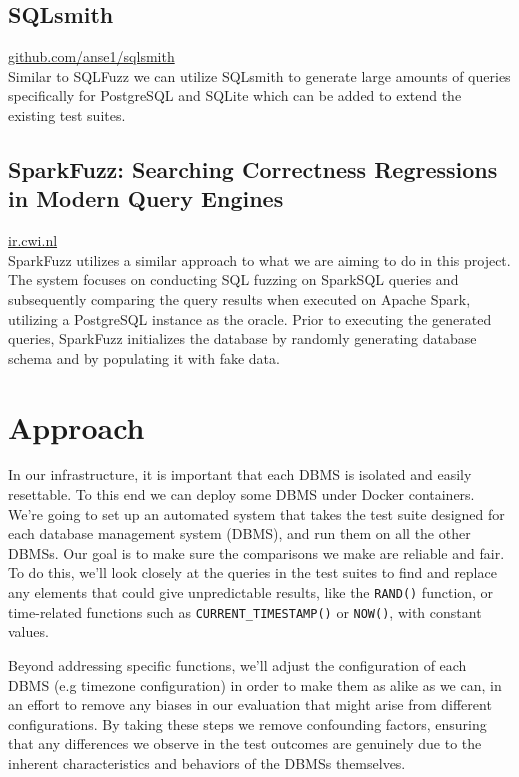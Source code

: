 \documentclass[acmsmall,nonacm]{acmart}
\newcommand\exthref[2]{\href{#1}{\faicon{share-square-o} #2}}
\begin{document}
\subsection*{SQLsmith}
\exthref{https://github.com/anse1/sqlsmith}{github.com/anse1/sqlsmith}\\
Similar to SQLFuzz we can utilize SQLsmith to generate large amounts of queries specifically for PostgreSQL and SQLite which can be added to extend the existing test suites.

\subsection*{SparkFuzz: Searching Correctness Regressions in Modern Query Engines}
\exthref{https://ir.cwi.nl/pub/30222/3395032.3395327.pdf}{ir.cwi.nl}\\
SparkFuzz utilizes a similar approach to what we are aiming to do in this project. The system focuses on conducting SQL fuzzing on SparkSQL queries and subsequently comparing the query results when executed on Apache Spark, utilizing a PostgreSQL instance as the oracle. Prior to executing the generated queries, SparkFuzz initializes the database by randomly generating  database schema and by populating it with fake data.



\section{Approach}
\label{sec:approach}
In our infrastructure, it is important that each DBMS is isolated and easily resettable. To this end we can deploy some DBMS under Docker containers. We're going to set up an automated system that takes the test suite designed for each database management system (DBMS), and run them on all the other DBMSs. Our goal is to make sure the comparisons we make are reliable and fair. To do this, we'll look closely at the queries in the test suites to find and replace any elements that could give unpredictable results, like the \texttt{RAND()} function, or time-related functions such as \texttt{CURRENT\_TIMESTAMP()} or \texttt{NOW()}, with constant values.

Beyond addressing specific functions, we'll adjust the configuration of each DBMS (e.g timezone configuration) in order to make them as alike as we can, in an effort to remove any biases in our evaluation that might arise from different configurations. By taking these steps we remove confounding factors, ensuring that any differences we observe in the test outcomes are genuinely due to the inherent characteristics and behaviors of the DBMSs themselves.
\end{document}
